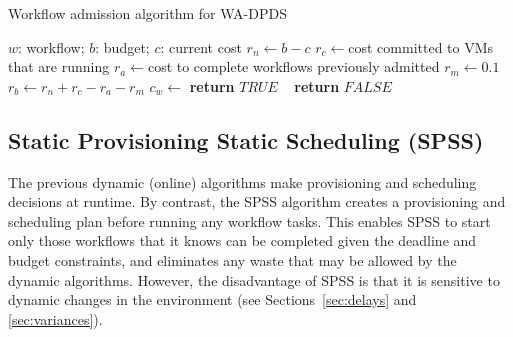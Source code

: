 \documentclass[conference]{IEEEtran}
\begin{document}

\begin{algorithm}[tb]
\caption{Workflow admission algorithm for WA-DPDS}
\label{alg:wa-dpds}
{\footnotesize
\begin{algorithmic}[1]
\Require $w$: workflow; $b$: budget; $c$: current cost
    \State $r_n\gets b-c$ 
    \State $r_c\gets $cost committed to VMs that are running
    \State $r_a\gets $cost to complete workflows previously admitted
  \State $r_m\gets 0.1$ 
  \State $r_b\gets r_n+r_c-r_a-r_m$ 
  \State $c_w\gets$ 
      \textbf{return} $TRUE$
    \Else ~  \textbf{return} $FALSE$
  \EndIf       
\EndProcedure
\end{algorithmic}
}
\end{algorithm}


\subsection{Static Provisioning Static Scheduling (SPSS)}

The previous dynamic (online) algorithms make provisioning and scheduling
decisions at runtime. By contrast, the SPSS algorithm creates a provisioning
and scheduling plan before running any workflow tasks. This enables SPSS to
start only those workflows that it knows can be completed given the deadline and
budget constraints, and eliminates any waste that may be allowed by the dynamic
algorithms. However, the disadvantage of SPSS is that it is sensitive to dynamic
changes in the environment (see Sections~\ref{sec:delays} and
\ref{sec:variances}).


\end{document}
